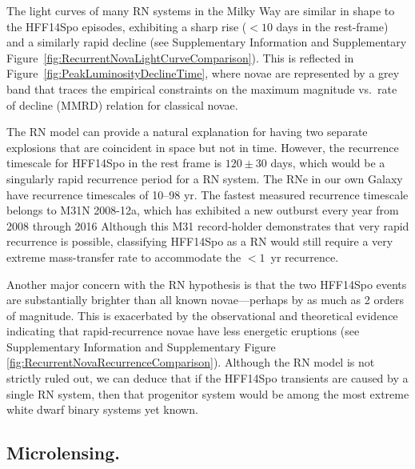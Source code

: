\documentclass{article}
\def\spock{HFF14Spo\xspace}
\begin{document}

The light curves of many RN systems in the Milky Way are similar in
shape to the \spock episodes, exhibiting a sharp rise ($<10$ days in
the rest-frame) and a similarly rapid decline (see Supplementary
Information and Supplementary
Figure~\ref{fig:RecurrentNovaLightCurveComparison}).  This is
reflected in Figure~\ref{fig:PeakLuminosityDeclineTime}, where novae
are represented by a grey band that traces the empirical constraints
on the maximum magnitude vs.\ rate of decline (MMRD) relation for
classical novae\cite{DellaValle:1995, Downes:2000}.

The RN model can provide a natural explanation for having two separate
explosions that are coincident in space but not in time.  However, the
recurrence timescale for \spock in the rest frame is $120\pm30$ days,
which would be a singularly rapid recurrence period for a RN system.
The RNe in our own Galaxy have recurrence timescales of 10--98
yr\cite{Schaefer:2010}.  The fastest measured recurrence timescale
belongs to M31N 2008-12a, which has exhibited a new outburst every
year from 2008 through 2016\cite{Tang:2014, Darnley:2016}
Although this M31 record-holder demonstrates that very rapid
recurrence is possible, classifying \spock as a RN would still require
a very extreme mass-transfer rate to accommodate the $<1$~yr
recurrence.


Another major concern with the RN hypothesis is that the two \spock
events are substantially brighter than all known novae---perhaps by as
much as 2 orders of magnitude.  This is exacerbated by the
observational and theoretical evidence indicating that
rapid-recurrence novae have less energetic eruptions\cite{Yaron:2005}
(see Supplementary Information and Supplementary Figure
\ref{fig:RecurrentNovaRecurrenceComparison}). Although the RN model is
not strictly ruled out, we can deduce that if the \spock transients
are caused by a single RN system, then that progenitor system would be
among the most extreme white dwarf binary systems yet known.

\subsection{Microlensing.}\label{sec:MicroLensing}
\end{document}
